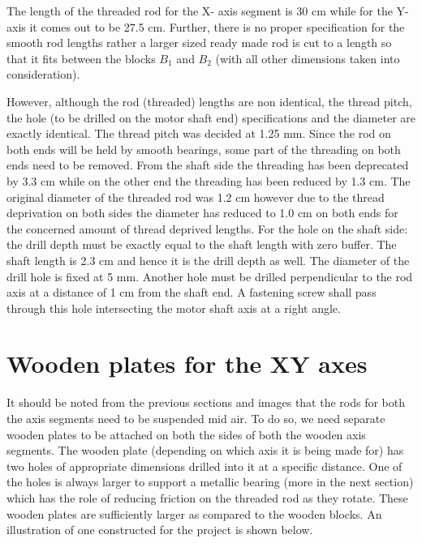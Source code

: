 The length of the threaded rod for the X- axis segment is 30 cm while for the Y- axis it comes out to be 27.5 cm. Further, there is no proper specification for the smooth rod lengths rather a larger sized ready made rod is cut to a length so that it fits between the blocks $B_{1}$ and $B_{2}$ (with all other dimensions taken into consideration). \par

However, although the rod (threaded) lengths are non identical, the thread pitch, the hole (to be drilled on the motor shaft end) specifications and the diameter are exactly identical. The thread pitch was decided at 1.25 mm. Since the rod on both ends will be held by smooth bearings, some part of the threading on both ends need to be removed. From the shaft side the threading has been deprecated by 3.3 cm while on the other end the threading has been reduced by 1.3 cm. The original diameter of the threaded rod was 1.2 cm however due to the thread deprivation on both sides the diameter has reduced to 1.0 cm on both ends for the concerned amount of thread deprived lengths. For the hole on the shaft side: the drill depth must be exactly equal to the shaft length with zero buffer. The shaft length is 2.3 cm and hence it is the drill depth as well. The diameter of the drill hole is fixed at 5 mm. Another hole must be drilled perpendicular to the rod axis at a distance of 1 cm from the shaft end. A fastening screw shall pass through this hole intersecting the motor shaft axis at a right angle.


\section{Wooden plates for the XY axes}

It should be noted from the previous sections and images that the rods for both the axis segments need to be suspended mid air. To do so, we need separate wooden plates to be attached on both the sides of both the wooden axis segments. The wooden plate (depending on which axis it is being made for) has two holes of appropriate dimensions drilled into it at a specific distance. One of the holes is always larger to support a metallic bearing (more in the next section) which has the role of reducing friction on the threaded rod as they rotate. These wooden plates are sufficiently larger as compared to the wooden blocks. An illustration of one constructed for the project is shown below.


